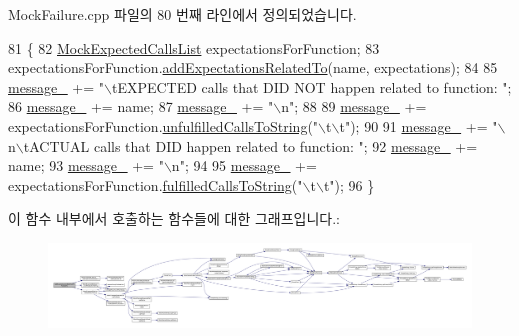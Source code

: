 Mock\+Failure.\+cpp 파일의 80 번째 라인에서 정의되었습니다.


\begin{DoxyCode}
81 \{
82     \hyperlink{class_mock_expected_calls_list}{MockExpectedCallsList} expectationsForFunction;
83     expectationsForFunction.\hyperlink{class_mock_expected_calls_list_a462f63288f7f9ae4b33d0b5d0eca265e}{addExpectationsRelatedTo}(name, expectations);
84 
85     \hyperlink{class_test_failure_af95aeab689fdb637c3e94b0c10db3e53}{message\_} += \textcolor{stringliteral}{"\(\backslash\)tEXPECTED calls that DID NOT happen related to function: "};
86     \hyperlink{class_test_failure_af95aeab689fdb637c3e94b0c10db3e53}{message\_} += name;
87     \hyperlink{class_test_failure_af95aeab689fdb637c3e94b0c10db3e53}{message\_} += \textcolor{stringliteral}{"\(\backslash\)n"};
88 
89     \hyperlink{class_test_failure_af95aeab689fdb637c3e94b0c10db3e53}{message\_} += expectationsForFunction.\hyperlink{class_mock_expected_calls_list_a81cdcb1eb8447b6835fd9c81df9cfa4e}{unfulfilledCallsToString}(\textcolor{stringliteral}{"\(\backslash\)t\(\backslash\)t"});
90 
91     \hyperlink{class_test_failure_af95aeab689fdb637c3e94b0c10db3e53}{message\_} += \textcolor{stringliteral}{"\(\backslash\)n\(\backslash\)tACTUAL calls that DID happen related to function: "};
92     \hyperlink{class_test_failure_af95aeab689fdb637c3e94b0c10db3e53}{message\_} += name;
93     \hyperlink{class_test_failure_af95aeab689fdb637c3e94b0c10db3e53}{message\_} += \textcolor{stringliteral}{"\(\backslash\)n"};
94 
95     \hyperlink{class_test_failure_af95aeab689fdb637c3e94b0c10db3e53}{message\_} += expectationsForFunction.\hyperlink{class_mock_expected_calls_list_a66959cff61f39f0857b2523e000c1e8c}{fulfilledCallsToString}(\textcolor{stringliteral}{"\(\backslash\)t\(\backslash\)t"});
96 \}
\end{DoxyCode}


이 함수 내부에서 호출하는 함수들에 대한 그래프입니다.\+:
\nopagebreak
\begin{figure}[H]
\begin{center}
\leavevmode
\includegraphics[width=350pt]{class_mock_failure_a24651d311fc939aed3e710afee30edbf_cgraph}
\end{center}
\end{figure}




